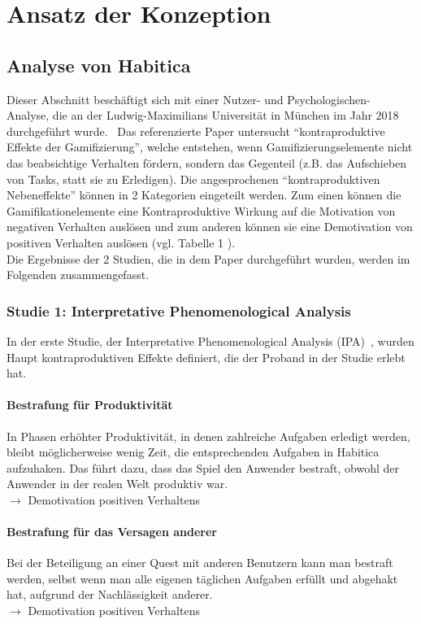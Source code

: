 \documentclass[sigconf, nonacm]{acmart}
\begin{document}
\section{Ansatz der Konzeption}

\subsection{Analyse von Habitica}
Dieser Abschnitt beschäftigt sich mit einer Nutzer- und Psychologischen- Analyse, die an der Ludwig-Maximilians Universität in München im Jahr 2018 durchgeführt wurde.~\cite{diefenbach_counterproductive_2019} Das referenzierte Paper untersucht \enquote{kontraproduktive Effekte der Gamifizierung}, welche entstehen, wenn Gamifizierungselemente nicht das beabsichtige Verhalten fördern, sondern das Gegenteil (z.B. das Aufschieben von Tasks, statt sie zu Erledigen). 
Die angesprochenen \enquote{kontraproduktiven Nebeneffekte} können in 2 Kategorien eingeteilt werden. Zum einen können die Gamifikationelemente eine Kontraproduktive Wirkung auf die Motivation von negativen Verhalten auslösen und zum anderen können sie eine Demotivation von positiven Verhalten auslösen (vgl. Tabelle 1 \cite{diefenbach_counterproductive_2019}).
\\
Die Ergebnisse der 2 Studien, die in dem Paper durchgeführt wurden, werden im Folgenden zusammengefasst.
\\
\subsubsection{Studie 1: Interpretative Phenomenological Analysis}
In der erste Studie, der  Interpretative Phenomenological Analysis (IPA)~\cite{smith_reflecting_2004}, wurden Haupt kontraproduktiven Effekte definiert, die der Proband in der Studie erlebt hat.

\paragraph{Bestrafung für Produktivität}\label{sec:cpe1}
In Phasen erhöhter Produktivität, in denen zahlreiche Aufgaben erledigt werden, bleibt möglicherweise wenig Zeit, die entsprechenden Aufgaben in Habitica aufzuhaken. Das führt dazu, dass das Spiel den Anwender bestraft, obwohl der Anwender in der realen Welt produktiv war.\\
$\rightarrow$ Demotivation positiven Verhaltens

\paragraph{Bestrafung für das Versagen  anderer}\label{sec:cpe2}
Bei der Beteiligung an einer Quest mit anderen Benutzern kann man bestraft werden, selbst wenn man alle eigenen täglichen Aufgaben erfüllt und abgehakt hat, aufgrund der Nachlässigkeit anderer.\\
$\rightarrow$ Demotivation positiven Verhaltens
\end{document}

